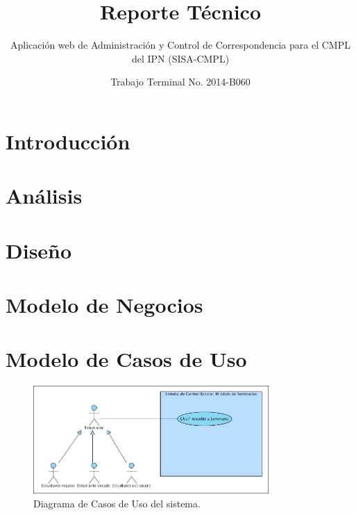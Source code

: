 \documentclass[oneside,10pt]{book}
\title{Reporte Técnico}
\subtitle{Aplicación web de Administración y Control de Correspondencia para el CMPL del IPN (SISA-CMPL)}
\author{Trabajo Terminal No. 2014-B060}
\begin{document}
\maketitle
\thispagestyle{empty}

\frontmatter
\tableofcontents

\mainmatter

\chapter{Introducción}




\chapter{Análisis}


\chapter{Diseño}



\chapter{Modelo de Negocios}


\chapter{Modelo de Casos de Uso}
	
	\begin{figure}[htbp!]
		\centering
			\includegraphics[width=0.8\textwidth]{images/CasosDeUso}
		\caption{Diagrama de Casos de Uso del sistema.}
	\end{figure}
	
\end{document}
